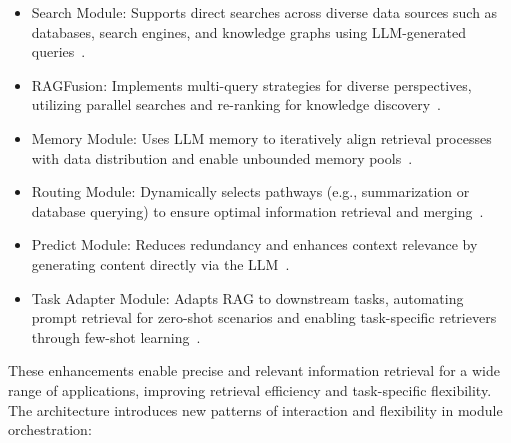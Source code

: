 \begin{enumerate}
{	      \begin{itemize}
		      \item Search Module: Supports direct searches across diverse data sources such as databases, search engines, and knowledge graphs using LLM-generated queries~\cite{ma2023query}.
		      \item RAGFusion: Implements multi-query strategies for diverse perspectives, utilizing parallel searches and re-ranking for knowledge discovery~\cite{shao2023enhancing}.
		      \item Memory Module: Uses LLM memory to iteratively align retrieval processes with data distribution and enable unbounded memory pools~\cite{cheng2023lift}.
		      \item Routing Module: Dynamically selects pathways (e.g., summarization or database querying) to ensure optimal information retrieval and merging~\cite{zheng2023take}.
		      \item Predict Module: Reduces redundancy and enhances context relevance by generating content directly via the LLM~\cite{yu2022generate}.
		      \item Task Adapter Module: Adapts RAG to downstream tasks, automating prompt retrieval for zero-shot scenarios and enabling task-specific retrievers through few-shot learning~\cite{wang2024bridging, asai2023selfrag}.
	      \end{itemize}
	      These enhancements enable precise and relevant information retrieval for a wide range of applications, improving retrieval efficiency and task-specific flexibility.
	      The architecture introduces new patterns of interaction and flexibility in module orchestration:

}
\end{enumerate}
